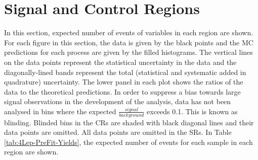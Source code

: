 \section{Signal and Control Regions}
\label{sec:sig-and-control-regions}
In this section, expected number of events of variables in each region are shown. For each figure in this section, the data is given by the black points and the MC predictions for each process are given by the filled histograms. The vertical lines on the data points represent the statistical uncertainty in the data and the diagonally-lined bands represent the total (statistical and systematic added in quadrature) uncertainty. The lower panel in each plot shows the ratios of the data to the theoretical predictions. In order to suppress a bias towards large signal observations in the development of the analysis, data has not been analysed in bins where the expected $\frac{signal}{background}$ exceeds 0.1. This is known as blinding. Blinded bins in the CRs are shaded with black diagonal lines and their data points are omitted. All data points are omitted in the SRs. In Table \ref{tab:4Lep-PreFit-Yields}, the expected number of events for each sample in each region are shown.
